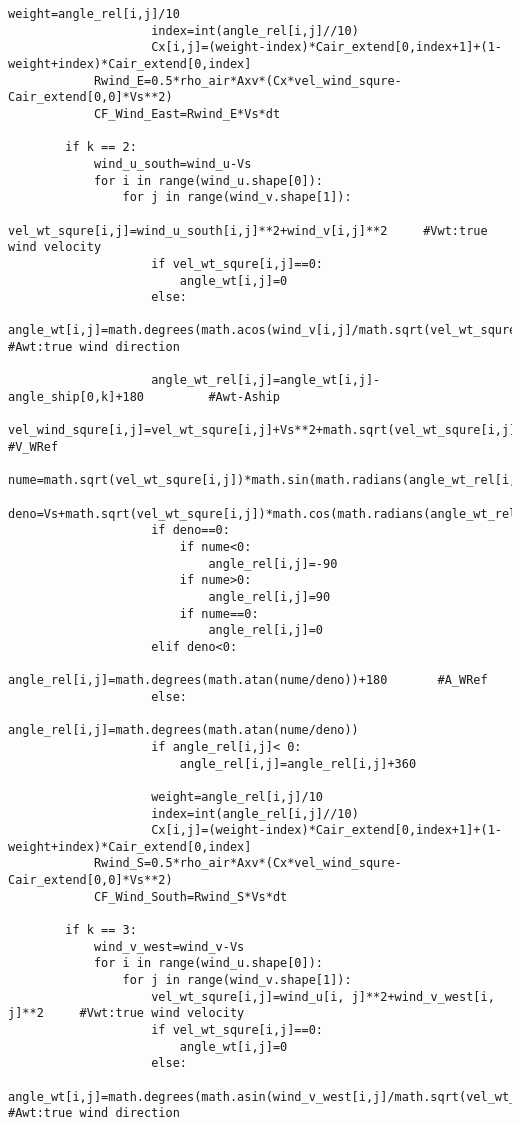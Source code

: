 \begin{lstlisting}[caption=Testing codes (\autoref{TestResults}), label=TestCodes]
                    weight=angle_rel[i,j]/10
                    index=int(angle_rel[i,j]//10)
                    Cx[i,j]=(weight-index)*Cair_extend[0,index+1]+(1-weight+index)*Cair_extend[0,index]
            Rwind_E=0.5*rho_air*Axv*(Cx*vel_wind_squre-Cair_extend[0,0]*Vs**2)
            CF_Wind_East=Rwind_E*Vs*dt

        if k == 2:
            wind_u_south=wind_u-Vs
            for i in range(wind_u.shape[0]):
                for j in range(wind_v.shape[1]):
                    vel_wt_squre[i,j]=wind_u_south[i,j]**2+wind_v[i,j]**2     #Vwt:true wind velocity
                    if vel_wt_squre[i,j]==0:
                        angle_wt[i,j]=0
                    else:
                        angle_wt[i,j]=math.degrees(math.acos(wind_v[i,j]/math.sqrt(vel_wt_squre[i,j]))) #Awt:true wind direction
                    
                    angle_wt_rel[i,j]=angle_wt[i,j]-angle_ship[0,k]+180         #Awt-Aship
                    vel_wind_squre[i,j]=vel_wt_squre[i,j]+Vs**2+math.sqrt(vel_wt_squre[i,j])*Vs*math.cos(math.radians(angle_wt_rel[i,j])) #V_WRef
                    nume=math.sqrt(vel_wt_squre[i,j])*math.sin(math.radians(angle_wt_rel[i,j]))
                    deno=Vs+math.sqrt(vel_wt_squre[i,j])*math.cos(math.radians(angle_wt_rel[i,j]))
                    if deno==0:
                        if nume<0:
                            angle_rel[i,j]=-90
                        if nume>0:
                            angle_rel[i,j]=90
                        if nume==0:
                            angle_rel[i,j]=0
                    elif deno<0:
                        angle_rel[i,j]=math.degrees(math.atan(nume/deno))+180       #A_WRef
                    else:
                        angle_rel[i,j]=math.degrees(math.atan(nume/deno))
                    if angle_rel[i,j]< 0:
                        angle_rel[i,j]=angle_rel[i,j]+360
                    
                    weight=angle_rel[i,j]/10
                    index=int(angle_rel[i,j]//10)
                    Cx[i,j]=(weight-index)*Cair_extend[0,index+1]+(1-weight+index)*Cair_extend[0,index]
            Rwind_S=0.5*rho_air*Axv*(Cx*vel_wind_squre-Cair_extend[0,0]*Vs**2)
            CF_Wind_South=Rwind_S*Vs*dt
        
        if k == 3:
            wind_v_west=wind_v-Vs
            for i in range(wind_u.shape[0]):
                for j in range(wind_v.shape[1]):
                    vel_wt_squre[i,j]=wind_u[i, j]**2+wind_v_west[i, j]**2     #Vwt:true wind velocity
                    if vel_wt_squre[i,j]==0:
                        angle_wt[i,j]=0
                    else:
                        angle_wt[i,j]=math.degrees(math.asin(wind_v_west[i,j]/math.sqrt(vel_wt_squre[i,j]))) #Awt:true wind direction
                    

\end{lstlisting}
